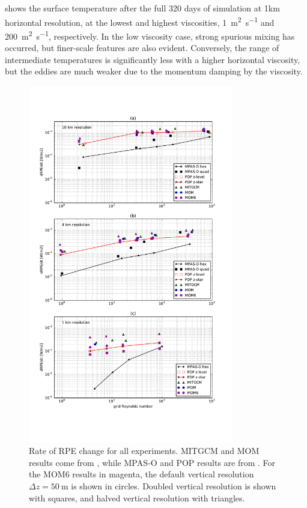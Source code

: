  shows the surface temperature after the full 320 days of simulation at 1km horizontal resolution, at the lowest and highest viscosities, \SI{1}{\square\metre\per\second} and \SI{200}{\square\metre\per\second}, respectively. In the low viscosity case, strong spurious mixing has occurred, but finer-scale features are also evident. Conversely, the range of intermediate temperatures is significantly less with a higher horizontal viscosity, but the eddies are much weaker due to the momentum damping by the viscosity.

\begin{figure}
  \includegraphics[width=0.8\textwidth]{../plots/eddies_drpe.pdf}
  \caption{\label{fig:eddies-drpe} Rate of RPE change for all experiments. MITGCM and MOM results come from \citet{ilicak12}, while MPAS-O and POP results are from \citet{petersen15}. For the MOM6 results in magenta, the default vertical resolution $\Delta z = \SI{50}{\metre}$ is shown in circles. Doubled vertical resolution is shown with squares, and halved vertical resolution with triangles.}
\end{figure}

